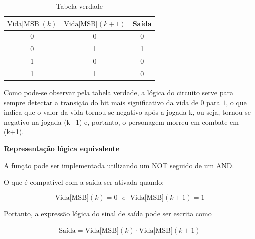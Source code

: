 \documentclass[12pt]{article}
\begin{document}
\begin{table}[H]
\caption{Tabela-verdade}
\centering
\renewcommand{\arraystretch}{1.3}
\begin{tabular}{|c|c|c|}
    \hline
    $\text{Vida[MSB]}(k)$ & $\text{Vida[MSB]}(k+1)$ & Saída \\
    \hline
    0 & 0 & 0 \\
    0 & 1 & 1 \\
1 & 0 & 0 \\
1 & 1 & 0 \\
\hline
\end{tabular}
\end{table}

Como pode-se observar pela tabela verdade, a lógica do circuito serve para sempre detectar a transição do bit mais significativo da vida
de $0$ para $1$, o que indica que o valor da vida tornou-se negativo após a jogada k, ou seja, tornou-se negativo na jogada (k+1) e, portanto, o personagem morreu em combate em (k+1).

\textbf{Representação lógica equivalente}

A função pode ser implementada utilizando um NOT seguido de um
AND.

\begin{center}
\end{center}

O que é compatível com a saída ser ativada quando:

\[
\text{Vida[MSB]}(k) = 0 \ \ \ e \ \ \ \text{Vida[MSB]}(k+1) = 1
\]

Portanto, a expressão lógica do sinal de saída pode ser escrita como

\[
\text{Saída} = \overline{\text{Vida[MSB]}(k)} \cdot \text{Vida[MSB]}(k+1)
\]
\end{document}
